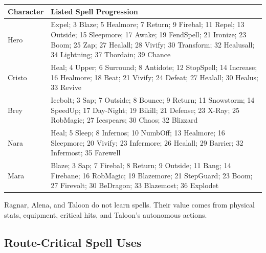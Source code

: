\documentclass[
  american,
  10pt,
  letterpaper,
  oneside,
  open=any]{scrreprt}
\newcounter{none} %
\newenvironment{guidetable}{%
  \small\setstretch{1.0}%
  \setlength{\tabcolsep}{4pt}%
  \setlength{\LTpre}{8pt}\setlength{\LTpost}{10pt}%
  \renewcommand{\arraystretch}{1.16}%
}{ }
\begin{document}
\begin{guidetable}

{\def\LTcaptype{none} %
\begin{longtable}[]{@{}
  >{\raggedright\arraybackslash}p{}
  >{\raggedright\arraybackslash}p{}@{}}
\toprule\noalign{}
\begin{minipage}[b]{\linewidth}\raggedright
\color{GuideGreen}\bfseries Character
\end{minipage} & \begin{minipage}[b]{\linewidth}\raggedright
\color{GuideGreen}\bfseries Listed Spell Progression
\end{minipage} \\
\midrule\noalign{}
\endhead
\bottomrule\noalign{}
\endlastfoot
Hero & 1 Expel; 3 Blaze; 5 Healmore; 7 Return; 9 Firebal; 11 Repel; 13
Outside; 15 Sleepmore; 17 Awake; 19 FendSpell; 21 Ironize; 23 Boom; 25
Zap; 27 Healall; 28 Vivify; 30 Transform; 32 Healusall; 34 Lightning; 37
Thordain; 39 Chance \\
Cristo & 1 Heal; 4 Upper; 6 Surround; 8 Antidote; 12 StopSpell; 14
Increase; 16 Healmore; 18 Beat; 21 Vivify; 24 Defeat; 27 Healall; 30
Healus; 33 Revive \\
Brey & 1 Icebolt; 3 Sap; 7 Outside; 8 Bounce; 9 Return; 11 Snowstorm; 14
SpeedUp; 17 Day-Night; 19 Bikill; 21 Defense; 23 X-Ray; 25 RobMagic; 27
Icespears; 30 Chaos; 32 Blizzard \\
Nara & 1 Heal; 5 Sleep; 8 Infernos; 10 NumbOff; 13 Healmore; 16
Sleepmore; 20 Vivify; 23 Infermore; 26 Healall; 29 Barrier; 32
Infermost; 35 Farewell \\
Mara & 1 Blaze; 3 Sap; 7 Firebal; 8 Return; 9 Outside; 11 Bang; 14
Firebane; 16 RobMagic; 19 Blazemore; 21 StepGuard; 23 Boom; 27 Firevolt;
30 BeDragon; 33 Blazemost; 36 Explodet \\
\end{longtable}
}

\end{guidetable}

Ragnar, Alena, and Taloon do not learn spells. Their value comes from
physical stats, equipment, critical hits, and Taloon's autonomous
actions.

\subsection{Route-Critical Spell Uses}\label{route-critical-spell-uses}
\end{document}
